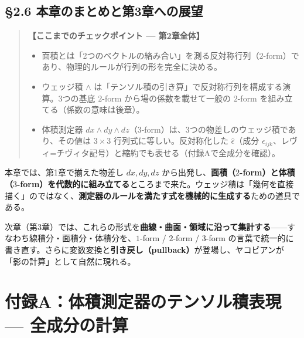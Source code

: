 \documentclass[a4paper,12pt,openany]{book}
\begin{document}
\hypertarget{ux672cux7ae0ux306eux307eux3068ux3081ux3068ux7b2c3ux7ae0ux3078ux306eux5c55ux671b}{%
\subsection{§2.6
本章のまとめと第3章への展望}\label{ux672cux7ae0ux306eux307eux3068ux3081ux3068ux7b2c3ux7ae0ux3078ux306eux5c55ux671b}}

\begin{quote}
\textbf{【ここまでのチェックポイント — 第2章全体】}

\begin{itemize}
\item
  面積とは「2つのベクトルの絡み合い」を測る反対称行列（\(2\)-form）であり、物理的ルールが行列の形を完全に決める。
\item
  ウェッジ積 \(\wedge\)
  は「テンソル積の引き算」で反対称行列を構成する演算。3つの基底
  \(2\)-form から場の係数を載せて一般の \(2\)-form
  を組み立てる（係数の意味は後章）。
\item
  体積測定器
  \(dx \wedge dy \wedge dz\)（\(3\)-form）は、3つの物差しのウェッジ積であり、その値は
  \(3 \times 3\) 行列式に等しい。反対称化した
  \(\widehat{\epsilon}\)（成分
  \(\epsilon_{ijk}\)、レヴィ=チヴィタ記号）と縮約でも表せる（付録Aで全成分を確認）。
\end{itemize}
\end{quote}

本章では、第1章で揃えた物差し \(dx, dy, dz\)
から出発し、\textbf{面積（}\(2\)\textbf{-form）と体積（}\(3\)\textbf{-form）を代数的に組み立てる}ところまで来た。ウェッジ積は「幾何を直接描く」のではなく、\textbf{測定器のルールを満たす式を機械的に生成する}ための道具である。

次章（第3章）では、これらの形式を\textbf{曲線・曲面・領域に沿って集計する}——すなわち線積分・面積分・体積分を、\(1\)-form
/ \(2\)-form / \(3\)-form
の言葉で統一的に書き直す。さらに変数変換と\textbf{引き戻し（pullback）}が登場し、ヤコビアンが「影の計算」として自然に現れる。

\par\vspace{0.35em}\par

\hypertarget{ux4ed8ux9332aux4f53ux7a4dux6e2cux5b9aux5668ux306eux30c6ux30f3ux30bdux30ebux7a4dux8868ux73fe-ux5168ux6210ux5206ux306eux8a08ux7b97}{%
\section{付録A：体積測定器のテンソル積表現 —
全成分の計算}\label{ux4ed8ux9332aux4f53ux7a4dux6e2cux5b9aux5668ux306eux30c6ux30f3ux30bdux30ebux7a4dux8868ux73fe-ux5168ux6210ux5206ux306eux8a08ux7b97}}
\end{document}
